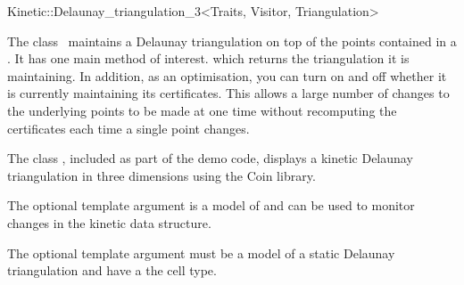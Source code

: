 

\begin{ccRefClass}{Kinetic::Delaunay_triangulation_3<Traits, Visitor, Triangulation>}  %


\ccDefinition
  
The class \ccRefName\ maintains a Delaunay triangulation on top of the
points contained in a . It has one main method
of interest.  which returns the triangulation it
is maintaining. In addition, as an optimisation, you can turn on and
off whether it is currently maintaining its certificates. This allows
a large number of changes to the underlying points to be made at one
time without recomputing the certificates each time a single point
changes.

The class , included as part
of the demo code, displays a kinetic Delaunay triangulation in three
dimensions using the Coin library.

The optional  template argument is a model of
 and can be used to monitor
changes in the kinetic data structure.

The optional  template argument must be a model of
a static Delaunay triangulation and have
 a the cell
type.



\ccTypes



\ccCreation
{}  %


\end{ccRefClass}
